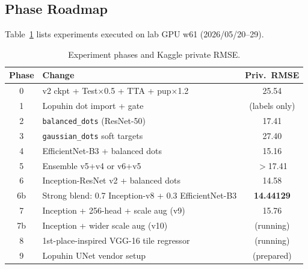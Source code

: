 \documentclass[12pt, a4paper]{article}
\begin{document}
\subsection{Phase Roadmap}
Table~\ref{tab:phases} lists experiments executed on lab GPU w61 (2026/05/20--29).

\begin{table}[htbp]
\centering
\caption{Experiment phases and Kaggle private RMSE.}
\label{tab:phases}
\begin{tabular}{@{}clc@{}}
\toprule
\textbf{Phase} & \textbf{Change} & \textbf{Priv.\ RMSE} \\ \midrule
0 & v2 ckpt + Test$\times$0.5 + TTA + pup$\times$1.2 & 25.54 \\
1 & Lopuhin dot import + gate & (labels only) \\
2 & \texttt{balanced\_dots} (ResNet-50) & 17.41 \\
3 & \texttt{gaussian\_dots} soft targets & 27.40 \\
4 & EfficientNet-B3 + balanced dots & 15.16 \\
5 & Ensemble v5+v4 or v6+v5 & $>$17.41 \\
6 & Inception-ResNet v2 + balanced dots & 14.58 \\
6b & Strong blend: 0.7 Inception-v8 + 0.3 EfficientNet-B3 & \textbf{14.44129} \\
7 & Inception + 256-head + scale aug (v9) & 15.76 \\
7b & Inception + wider scale aug (v10) & (running) \\
8 & 1st-place-inspired VGG-16 tile regressor & (running) \\
9 & Lopuhin UNet vendor setup & (prepared) \\ \bottomrule
\end{tabular}
\end{table}
\end{document}
